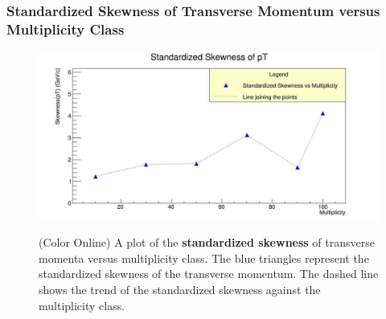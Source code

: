 \documentclass[letterpaper,aps,prc,superscriptaddress,nofootinbib,10pt,showpacs,floatfix]{revtex4-2}
\begin{document}
\subsubsection{Standardized Skewness of Transverse Momentum versus Multiplicity Class}
\label{subsubsec:stdskew}
\vspace{-5mm}
\begin{figure}[!htb]
\begin{minipage}{\textwidth}
   \label{Fig:8}
     \centering
     \renewcommand{\thefigure}{8}
     \includegraphics[width=\linewidth]{stdskew}
     \begin{minipage}{0.8\textwidth}
     \caption{(Color Online) A plot of the \textbf{standardized skewness} of transverse momenta versus multiplicity class. The blue triangles represent the standardized skewness of the transverse momentum. The dashed line shows the trend of the standardized skewness against the multiplicity class.}
     \end{minipage}     
\end{minipage}
\end{figure}

\FloatBarrier
\vspace{-1mm}
\end{document}
